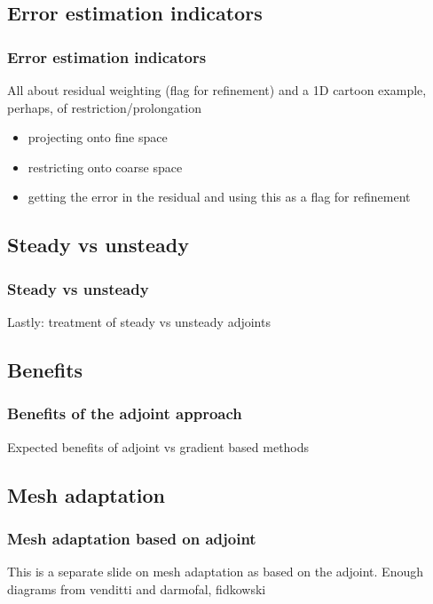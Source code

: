 \documentclass{beamer}
\begin{document}
\subsection{Error estimation indicators}
\begin{frame}
\scriptsize
\frametitle{Error estimation indicators}
All about residual weighting (flag for refinement) and a 1D cartoon example, perhaps, of restriction/prolongation
\begin{itemize}
\item projecting onto fine space
\item restricting onto coarse space
\item getting the error in the residual and using this as a flag for refinement
\end{itemize}
\end{frame}

\subsection{Steady vs unsteady}
\begin{frame}
\frametitle{Steady vs unsteady}
Lastly: treatment of steady vs unsteady adjoints
\end{frame}

\subsection{Benefits}
\begin{frame}
\scriptsize
\frametitle{Benefits of the adjoint approach}
Expected benefits of adjoint vs gradient based methods
\end{frame}

\subsection{Mesh adaptation}
\begin{frame}
\scriptsize
\frametitle{Mesh adaptation based on adjoint}
This is a separate slide on mesh adaptation as based on the adjoint. Enough diagrams from venditti and darmofal, fidkowski
\end{frame}

\end{document}

